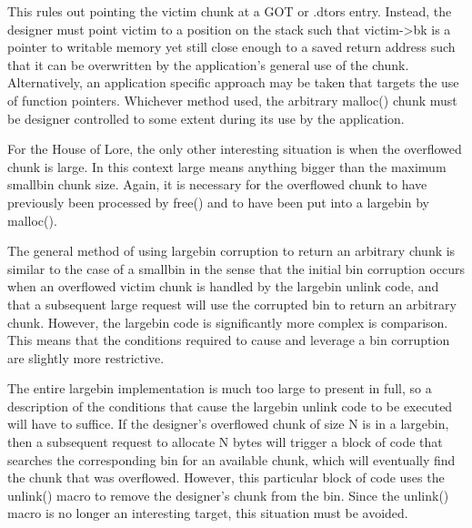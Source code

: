 \documentclass[12pt]{article}
\begin{document}
This rules out pointing the victim chunk at a GOT or .dtors entry.
Instead, the designer must point victim to a position on the stack
such that victim->bk is a pointer to writable memory yet still
close enough to a saved return address such that it can be
overwritten by the application's general use of the chunk.
Alternatively, an application specific approach may be taken that
targets the use of function pointers. Whichever method used, the
arbitrary malloc() chunk must be designer controlled to some extent
during its use by the application.
\newline


For the House of Lore, the only other interesting situation is when
the overflowed chunk is large. In this context large means anything
bigger than the maximum smallbin chunk size. Again, it is necessary
for the overflowed chunk to have previously been processed by
free() and to have been put into a largebin by malloc().
\newline


The general method of using largebin corruption to return an
arbitrary chunk is similar to the case of a smallbin in the sense
that the initial bin corruption occurs when an overflowed victim
chunk is handled by the largebin unlink code, and that a subsequent
large request will use the corrupted bin to return an arbitrary
chunk. However, the largebin code is significantly more complex is
comparison. This means that the conditions required to cause and
leverage a bin corruption are slightly more restrictive.
\newline


The entire largebin implementation is much too large to present in
full, so a description of the conditions that cause the largebin
unlink code to be executed will have to suffice. If the designer's
overflowed chunk of size N is in a largebin, then a subsequent
request to allocate N bytes will trigger a block of code that
searches the corresponding bin for an available chunk, which will
eventually find the chunk that was overflowed. However, this
particular block of code uses the unlink() macro to remove the
designer's chunk from the bin. Since the unlink() macro is no
longer an interesting target, this situation must be avoided.
\newline
\end{document}

